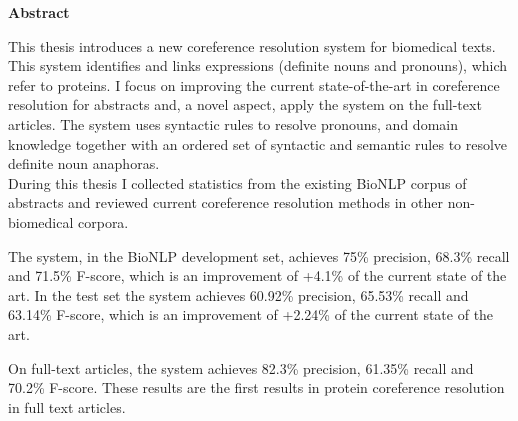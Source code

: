 

\clearemptydoublepage
{}
{}





\vspace*{2cm}
\begin{center}
{\Large \bf Abstract}
\end{center}
\vspace{1cm}
This thesis introduces a new coreference resolution system for biomedical texts. This system identifies and links expressions (definite nouns and pronouns), which refer to proteins. I focus on improving the current state-of-the-art in coreference resolution for abstracts and, a novel aspect, apply the system on the full-text articles. The system uses syntactic rules to resolve pronouns, and domain knowledge together with an ordered set of syntactic and semantic rules to resolve definite noun anaphoras. \\
  During this thesis I collected statistics from the existing BioNLP corpus of abstracts and reviewed current coreference resolution methods in other non-biomedical corpora.
  
  The system, in the BioNLP development set, achieves 75\% precision, 68.3\% recall  and  71.5\% F-score, which is an improvement of +4.1\% of the current state of the art. In the test set the system achieves 60.92\% precision, 65.53\% recall and 63.14\% F-score, which is an improvement of +2.24\% of the current state of the art. 
 
On full-text articles, the system achieves 82.3\% precision, 61.35\% recall and 70.2\% F-score. These results are the first results in protein coreference resolution in full text articles. 


